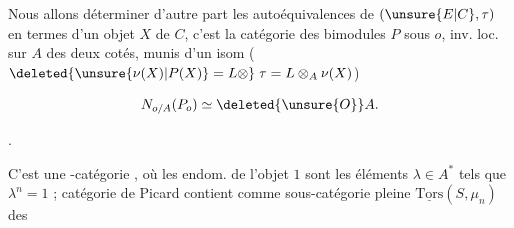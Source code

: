 Nous allons déterminer d'autre part les autoéquivalences de $(\unsure{E|C},\tau)$ \unsure{;}
en termes d'un objet $X$ de $C$, 
c'est la catégorie des  bimodules
$P$ sous $o$, inv. loc. sur $A$ des deux cotés,
munis d'un isom  ($\deleted{\unsure{\nu(X)|P(X)}=L\otimes}\;\tau=L\otimes_A\nu(X)$)

\[
 N_{o/A}(P_o)\simeq\deleted{\unsure{O}} A.
\]


.

C'est une -catégorie , où les endom.
de l'objet $1$ sont les éléments $\lambda\in A^*$ tels que $\lambda^n=1$ ;
 catégorie de Picard contient comme sous-catégorie pleine $\underline{\mathrm{Tors}}(S,\mu_n)$ des
